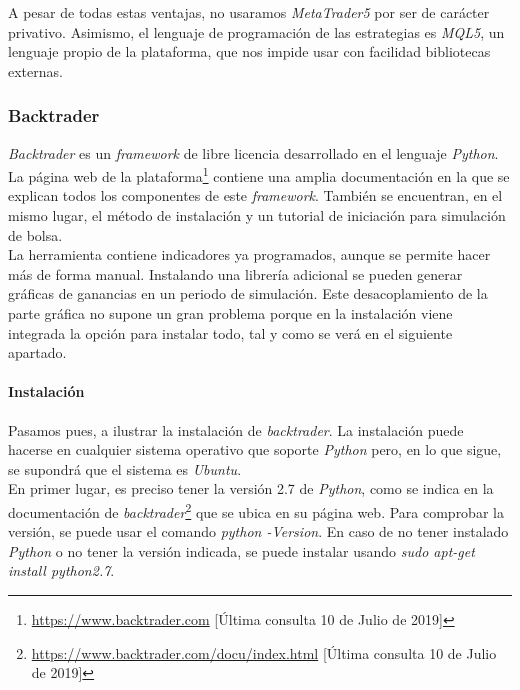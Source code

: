 		A pesar de todas estas ventajas, no usaramos \textit{MetaTrader5} por ser de car\'acter privativo. Asimismo, el lenguaje de programaci\'on de las estrategias es \textit{MQL5}, un lenguaje propio de la plataforma, que nos impide usar con facilidad bibliotecas externas.\\
	
		\subsubsection{Backtrader}\label{sec:backtrader}
		
		\textit{Backtrader} es un \textit{framework} de libre licencia desarrollado en el lenguaje \textit{Python}. La p\'agina web de la plataforma\footnote{\url{https://www.backtrader.com} [\'Ultima consulta 10 de Julio de 2019]} contiene una amplia documentaci\'on en la que se explican todos los componentes de este \textit{framework}. Tambi\'en se encuentran, en el mismo lugar, el m\'etodo de instalaci\'on y un tutorial de iniciaci\'on para simulaci\'on de bolsa.\\
		
		La herramienta contiene indicadores ya programados, aunque se permite hacer m\'as de forma manual.  Instalando una librer\'ia adicional se pueden generar gr\'aficas de ganancias en un periodo de simulaci\'on. Este desacoplamiento de la parte gr\'afica no supone un gran problema porque en la instalaci\'on viene integrada la opci\'on para instalar todo, tal y como se ver\'a en el siguiente apartado.\\
		
		
		\paragraph{Instalaci\'on}\label{sec:install}
		
		Pasamos pues, a ilustrar la instalaci\'on de \textit{backtrader}. La instalaci\'on puede hacerse en cualquier sistema operativo que soporte \textit{Python} pero, en lo que sigue, se supondr\'a que el sistema es \textit{Ubuntu}. \\
		
		En primer lugar, es preciso tener la versi\'on 2.7 de \textit{Python}, como se indica en la documentaci\'on de \textit{backtrader}\footnote{\url{https://www.backtrader.com/docu/index.html} [\'Ultima consulta 10 de Julio de 2019]} que se ubica en su p\'agina web. Para comprobar la versi\'on, se puede usar el comando \textit{python -Version}. En caso de no tener instalado \textit{Python} o no tener la versi\'on indicada, se puede instalar usando \textit{sudo apt-get install python2.7}.\\
		
